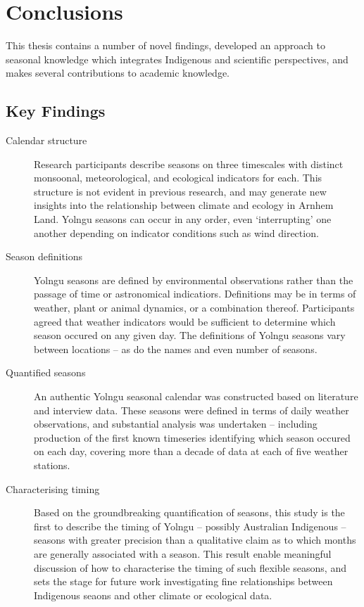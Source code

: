 \chapter{Conclusions}
\label{ch:conclusion}

This thesis contains a number of novel findings, developed an approach
to seasonal knowledge which integrates Indigenous and scientific perspectives,
and makes several contributions to academic knowledge.


\section{Key Findings}

\begin{description}
\item[Calendar structure]
    Research participants describe seasons on three timescales with distinct
    monsoonal, meteorological, and ecological indicators for each.  This
    structure is not evident in previous research, and may generate new
    insights into the relationship between climate and ecology in Arnhem Land.
    Yolngu seasons can occur in any order, even `interrupting' one another
    depending on indicator conditions such as wind direction.

\item[Season definitions]
    Yolngu seasons are defined by environmental observations rather than the
    passage of time or astronomical indicatiors.  Definitions may be in terms
    of weather, plant or animal dynamics, or a combination thereof.
    Participants agreed that weather indicators would be sufficient to
    determine which season occured on any given day.  The definitions of
    Yolngu seasons vary between locations -- as do the names and even number
    of seasons.

\item[Quantified seasons]
    An authentic Yolngu seasonal calendar was constructed based on literature
    and interview data.  These seasons were defined in terms of daily weather
    observations, and substantial analysis was undertaken -- including
    production of the first known timeseries identifying which season occured
    on each day, covering more than a decade of data at each of five weather
    stations.

\item[Characterising timing]
    Based on the groundbreaking quantification of seasons, this study is the
    first to describe the timing of Yolngu -- possibly Australian Indigenous --
    seasons with greater precision than a qualitative claim as to which months
    are generally associated with a season.  This result enable meaningful
    discussion of how to characterise the timing of such flexible seasons,
    and sets the stage for future work investigating fine relationships between
    Indigenous seaons and other climate or ecological data.

\end{description}


